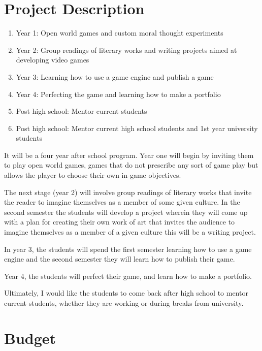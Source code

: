 \documentclass[
  letterpaper,
  DIV=11,
  numbers=noendperiod]{scrreprt}
\providecommand{\tightlist}{%
  \setlength{\itemsep}{0pt}\setlength{\parskip}{0pt}}\usepackage{longtable,booktabs,array}
\begin{document}
\begin{tcolorbox}[enhanced jigsaw, arc=.35mm, breakable, rightrule=.15mm, colback=white, colframe=quarto-callout-important-color-frame, bottomrule=.15mm, leftrule=.75mm, opacityback=0, toprule=.15mm, left=2mm]
\begin{tcolorbox}[enhanced jigsaw, arc=.35mm, breakable, rightrule=.15mm, colback=white, colframe=quarto-callout-tip-color-frame, bottomrule=.15mm, leftrule=.75mm, opacityback=0, toprule=.15mm, left=2mm]
\section{Project Description}\label{project-description}

\begin{enumerate}
\def\labelenumi{\arabic{enumi}.}
\tightlist
\item
  Year 1: Open world games and custom moral thought experiments
\item
  Year 2: Group readings of literary works and writing projects aimed at
  developing video games
\item
  Year 3: Learning how to use a game engine and publish a game
\item
  Year 4: Perfecting the game and learning how to make a portfolio
\item
  Post high school: Mentor current students
\item
  Post high school: Mentor current high school students and 1st year
  university students
\end{enumerate}

It will be a four year after school program. Year one will begin by
inviting them to play open world games, games that do not prescribe any
sort of game play but allows the player to choose their own in-game
objectives.

The next stage (year 2) will involve group readings of literary works
that invite the reader to imagine themselves as a member of some given
culture. In the second semester the students will develop a project
wherein they will come up with a plan for creating their own work of art
that invites the audience to imagine themselves as a member of a given
culture this will be a writing project.

In year 3, the students will spend the first semester learning how to
use a game engine and the second semester they will learn how to publish
their game.

Year 4, the students will perfect their game, and learn how to make a
portfolio.

Ultimately, I would like the students to come back after high school to
mentor current students, whether they are working or during breaks from
university.

\section{Budget}\label{budget}


\end{tcolorbox}
\end{tcolorbox}
\end{document}
